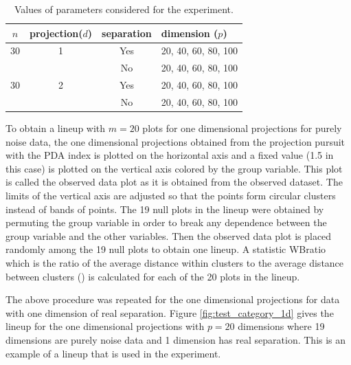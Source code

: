 \begin{table}[htbp]
\begin{center}
\caption{Values of parameters considered for the experiment.}
\begin{tabular}{cccp{3cm}}
  \hline
  \hline
  $n$ & projection($d$) & separation & dimension ($p$) \\
  \hline
  30 & 1 & Yes & 20, 40, 60, 80, 100 \\
      & & No & 20, 40, 60, 80, 100\\
   30 & 2 & Yes & 20, 40, 60, 80, 100 \\
     & & No & 20, 40, 60, 80, 100\\   
      \hline
\end{tabular}
\label{freq}
\end{center}
\end{table}


To obtain a lineup with $m = 20$ plots for one dimensional projections for purely noise data, the one dimensional projections obtained from the projection pursuit with the PDA index is plotted on the horizontal axis and a fixed value (1.5 in this case) is plotted on the vertical axis colored by the group variable. This plot is called the observed data plot as it is obtained from the observed dataset. The limits of the vertical axis are adjusted so that the points form circular clusters instead of bands of points. The 19 null plots in the lineup were obtained by  permuting the group variable in order to break any dependence between the group variable and the other variables. Then the observed data plot is placed randomly among the 19 null plots to obtain one lineup. A statistic WBratio which is the ratio of the average distance within clusters to the average distance between clusters (\cite{hennig:2010}) is calculated for each of the 20 plots in the lineup. 

The above procedure was repeated for the one dimensional projections for data with one dimension of real separation. Figure \ref{fig:test_category_1d} gives the lineup  for the one dimensional projections with $p = 20$ dimensions where 19 dimensions are purely noise data and 1 dimension has real separation. This is an example of a lineup that is used in the experiment. 


